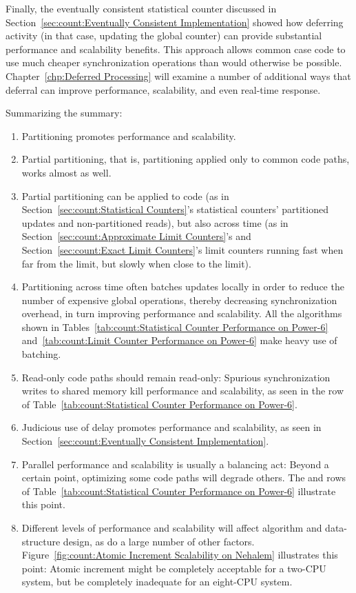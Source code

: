 Finally, the eventually consistent statistical counter discussed in
Section~\ref{sec:count:Eventually Consistent Implementation}
showed how deferring activity (in that case, updating the global
counter) can provide substantial performance and scalability benefits.
This approach allows common case code to use much cheaper synchronization
operations than would otherwise be possible.
Chapter~\ref{chp:Deferred Processing} will examine a number of additional
ways that deferral can improve performance, scalability, and even
real-time response.

Summarizing the summary:

\begin{enumerate}
\item	Partitioning promotes performance and scalability.
\item	Partial partitioning, that is, partitioning applied only to
	common code paths, works almost as well.
\item	Partial partitioning can be applied to code (as in
	Section~\ref{sec:count:Statistical Counters}'s statistical
	counters' partitioned updates and non-partitioned reads), but also
	across time (as in
	Section~\ref{sec:count:Approximate Limit Counters}'s and
	Section~\ref{sec:count:Exact Limit Counters}'s
	limit counters running fast when far from
	the limit, but slowly when close to the limit).
\item	Partitioning across time often batches updates locally
	in order to reduce the number of expensive global operations,
	thereby decreasing synchronization overhead, in turn
	improving performance and scalability.
	All the algorithms shown in
	Tables~\ref{tab:count:Statistical Counter Performance on Power-6}
	and~\ref{tab:count:Limit Counter Performance on Power-6}
	make heavy use of batching.
\item	Read-only code paths should remain read-only:  Spurious
	synchronization writes to shared memory kill performance
	and scalability, as seen in the  row of
	Table~\ref{tab:count:Statistical Counter Performance on Power-6}.
\item	Judicious use of delay promotes performance and scalability, as
	seen in Section~\ref{sec:count:Eventually Consistent Implementation}.
\item	Parallel performance and scalability is usually a balancing act:
	Beyond a certain point, optimizing some code paths will degrade
	others.
	The  and  rows of
	Table~\ref{tab:count:Statistical Counter Performance on Power-6}
	illustrate this point.
\item	Different levels of performance and scalability will affect
	algorithm and data-structure design, as do a large number of
	other factors.
	Figure~\ref{fig:count:Atomic Increment Scalability on Nehalem}
	illustrates this point:  Atomic increment might be completely
	acceptable for a two-CPU system, but be completely inadequate for an
	eight-CPU system.
\end{enumerate}

